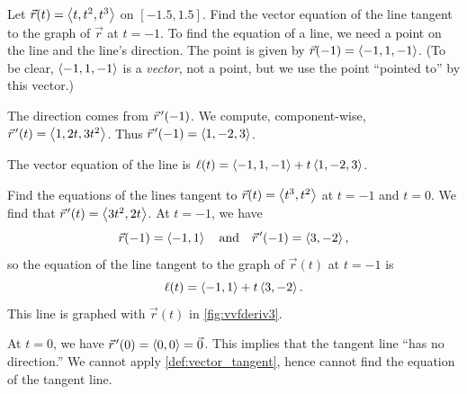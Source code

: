 \begin{example}\label{ex_vvfderiv1}%
Let
%
\iftoggle{in_threeD}{%
 \mtable{Graphing a curve in space with its tangent line.}{fig:vvfderiv1}{%
 \myincludeasythree{
 3Droll=0.5961816528018784,
 3Dortho=0.00514203542843461,
 3Dc2c=0.8352102637290955 0.5152699947357178 0.19214747846126556,
 3Dcoo=-5.658682346343994 19.23411750793457 0.2712952494621277,
 3Droo=149.99999927774635}{\marginparwidth}{Plane curve r(t)=⟨t,t^2–1⟩ (blue) with red tangent line l(t) = r(0)+t r′(0) touching at (0, 0).}{figures/figvvfderiv1_3D}}
}{%
 \mtable{Graphing a curve in space with its tangent line.}{fig:vvfderiv1}{%
 \myincludegraphics[alt={Plane curve r(t)=⟨t,t²–1⟩ (blue) with red tangent line l(t) = r(0)+t r′(0) touching at (0, 0).},width=\marginparwidth]{figures/figvvfderiv1_3D}
 \\(a)\\[10pt]
 \myincludegraphics[alt={Another view of the previous image.},width=\marginparwidth]{figures/figvvfderiv1b_3D}
 \\(b)}%
}%
%
$\vec r(t) =\left\langle t,t^2,t^3\right\rangle$ on $[-1.5,1.5]$. Find the vector equation of the line tangent to the graph of $\vec r$ at $t=-1$.
\solution
To find the equation of a line, we need a point on the line and the line's direction. The point is given by $\vec r(-1) =\left\langle -1,1,-1\right\rangle$. (To be clear, $\left\langle -1,1,-1\right\rangle$ is a \emph{vector}, not a point, but we use the point ``pointed to'' by this vector.)

The direction comes from $\vec r\hskip1.25pt '(-1)$. We compute, component-wise, $\vec r\hskip1.25pt '(t) =\left\langle 1,2t, 3t^2\right\rangle$. Thus $\vec r\hskip1.25pt '(-1) =\left\langle 1,-2,3\right\rangle$. 

The vector equation of the line is $\ell(t) =\left\langle -1,1,-1\right\rangle+ t\left\langle 1,-2,3\right\rangle$. \iftoggle{in_threeD}{This line and $\vec r(t)$ are sketched in \autoref{fig:vvfderiv1}.}{This line and $\vec r(t)$ are sketched, from two perspectives, in \autoref{fig:vvfderiv1} (a) and (b).}
\end{example}

\begin{example}\label{ex_vvfderiv3}%
Find the equations of the lines tangent to $\vec r(t) =\left\langle t^3,t^2\right\rangle$ at $t=-1$ and $t=0$.
\solution
We find that $\vec r\hskip1.25pt '(t) =\left\langle 3t^2,2t\right\rangle$. At $t=-1$, we have
\[\vec r(-1) =\left\langle -1,1\right\rangle\quad \text{and}\quad \vec r\hskip1.25pt '(-1) =\left\langle 3,-2\right\rangle,\]
so the equation of the line tangent to the graph of $\vec r(t)$ at $t=-1$ is
\[\ell(t) =\left\langle -1,1\right\rangle+ t\left\langle 3,-2\right\rangle.\]
This line is graphed with $\vec r(t)$ in \autoref{fig:vvfderiv3}.

At $t=0$, we have $\vec r\hskip1.25pt '(0) =\left\langle 0,0\right\rangle=\vec 0$. This implies that the tangent line ``has no direction.'' We cannot apply \autoref{def:vector_tangent}, hence cannot find the equation of the tangent line.
\end{example}

